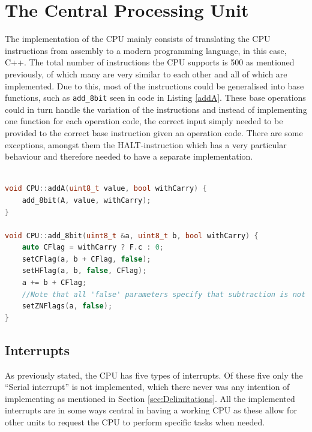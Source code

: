 \section{The Central Processing Unit}
\label{sec:CPUResults}
The implementation of the CPU mainly consists of translating the CPU instructions from assembly to a modern programming language, in this case, C++. The total number of instructions the CPU supports is 500 as mentioned previously, of which many are very similar to each other and all of which are implemented. Due to this, most of the instructions could be generalised into base functions, such as \texttt{add\_8bit} seen in code in Listing \ref{addA}. These base operations could in turn handle the variation of the instructions and instead of implementing one function for each operation code, the correct input simply needed to be provided to the correct base instruction given an operation code. There are some exceptions, amongst them the HALT-instruction \cite{HALT-behaviour} which has a very particular behaviour and therefore needed to have a separate implementation.
\\\\
\begin{lstlisting}[language=C++,
caption = {Code displaying a generalised method used, in this case an addition function which allows for addition between register A and all other registers, both with and without the use of the carry bit.},
label = {addA}]
void CPU::addA(uint8_t value, bool withCarry) {
    add_8bit(A, value, withCarry);
}

void CPU::add_8bit(uint8_t &a, uint8_t b, bool withCarry) {
    auto CFlag = withCarry ? F.c : 0;
    setCFlag(a, b + CFlag, false);
    setHFlag(a, b, false, CFlag);
    a += b + CFlag;
    //Note that all 'false' parameters specify that subtraction is not used, which in turn affects how and which flags are set.
    setZNFlags(a, false);
}
\end{lstlisting}

\subsection{Interrupts}
As previously stated, the CPU has five types of interrupts. Of these five only the ``Serial interrupt'' is not implemented, which there never was any intention of implementing as mentioned in Section \ref{sec:Delimitations}. All the implemented interrupts are in some ways central in having a working CPU as these allow for other units to request the CPU to perform specific tasks when needed.
\newpage
